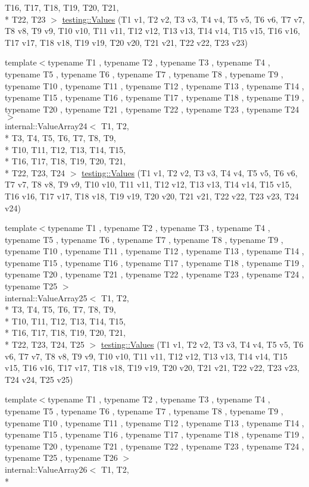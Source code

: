 \begin{DoxyCompactItemize}
T16, T17, T18, T19, T20, T21, \\*
T22, T23 $>$ \hyperlink{namespacetesting_a820991f1c28518a0c218176bd7192de8}{testing\-::\-Values} (T1 v1, T2 v2, T3 v3, T4 v4, T5 v5, T6 v6, T7 v7, T8 v8, T9 v9, T10 v10, T11 v11, T12 v12, T13 v13, T14 v14, T15 v15, T16 v16, T17 v17, T18 v18, T19 v19, T20 v20, T21 v21, T22 v22, T23 v23)
\item 
{\footnotesize template$<$typename T1 , typename T2 , typename T3 , typename T4 , typename T5 , typename T6 , typename T7 , typename T8 , typename T9 , typename T10 , typename T11 , typename T12 , typename T13 , typename T14 , typename T15 , typename T16 , typename T17 , typename T18 , typename T19 , typename T20 , typename T21 , typename T22 , typename T23 , typename T24 $>$ }\\internal\-::\-Value\-Array24$<$ T1, T2, \\*
T3, T4, T5, T6, T7, T8, T9, \\*
T10, T11, T12, T13, T14, T15, \\*
T16, T17, T18, T19, T20, T21, \\*
T22, T23, T24 $>$ \hyperlink{namespacetesting_a74b2375fe8c3c685e6f7b0b6a9b61009}{testing\-::\-Values} (T1 v1, T2 v2, T3 v3, T4 v4, T5 v5, T6 v6, T7 v7, T8 v8, T9 v9, T10 v10, T11 v11, T12 v12, T13 v13, T14 v14, T15 v15, T16 v16, T17 v17, T18 v18, T19 v19, T20 v20, T21 v21, T22 v22, T23 v23, T24 v24)
\item 
{\footnotesize template$<$typename T1 , typename T2 , typename T3 , typename T4 , typename T5 , typename T6 , typename T7 , typename T8 , typename T9 , typename T10 , typename T11 , typename T12 , typename T13 , typename T14 , typename T15 , typename T16 , typename T17 , typename T18 , typename T19 , typename T20 , typename T21 , typename T22 , typename T23 , typename T24 , typename T25 $>$ }\\internal\-::\-Value\-Array25$<$ T1, T2, \\*
T3, T4, T5, T6, T7, T8, T9, \\*
T10, T11, T12, T13, T14, T15, \\*
T16, T17, T18, T19, T20, T21, \\*
T22, T23, T24, T25 $>$ \hyperlink{namespacetesting_a74baf6524bda9b5799e313541b4816ea}{testing\-::\-Values} (T1 v1, T2 v2, T3 v3, T4 v4, T5 v5, T6 v6, T7 v7, T8 v8, T9 v9, T10 v10, T11 v11, T12 v12, T13 v13, T14 v14, T15 v15, T16 v16, T17 v17, T18 v18, T19 v19, T20 v20, T21 v21, T22 v22, T23 v23, T24 v24, T25 v25)
\item 
{\footnotesize template$<$typename T1 , typename T2 , typename T3 , typename T4 , typename T5 , typename T6 , typename T7 , typename T8 , typename T9 , typename T10 , typename T11 , typename T12 , typename T13 , typename T14 , typename T15 , typename T16 , typename T17 , typename T18 , typename T19 , typename T20 , typename T21 , typename T22 , typename T23 , typename T24 , typename T25 , typename T26 $>$ }\\internal\-::\-Value\-Array26$<$ T1, T2, \\*

\end{DoxyCompactItemize}
